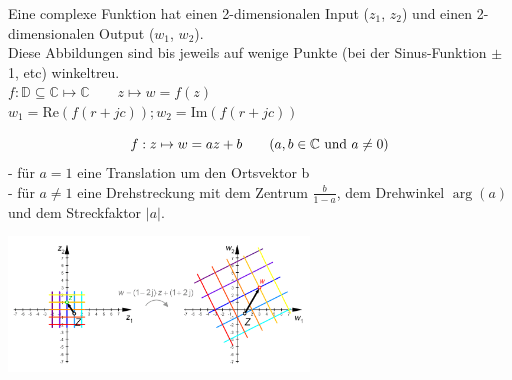 
\newpage
{}
Eine complexe Funktion hat einen 2-dimensionalen Input ($z_1$, $z_2$) und einen
2-dimensionalen Output ($w_1$, $w_2$). \\
Diese Abbildungen sind bis jeweils auf wenige Punkte (bei der Sinus-Funktion
$\pm$1, etc) winkeltreu.\\
$ f: \mathbb{D} \subseteq \mathbb{C} \mapsto \mathbb{C} \qquad z  \mapsto w = f(z)$\\
$w_1 = \text{Re}(f(r+jc)); w_2 = \text{Im}(f(r+jc))$ 
 

 	\begin{minipage}{9cm}
       $$ f : z \mapsto w = az + b \qquad (a, b \in \mathbb{C} \text{ und } a \neq0)\\$$
		- für $a = 1$ eine Translation um den Ortsvektor b \\
		- für $a \neq 1$ eine Drehstreckung mit dem Zentrum $\frac{b}{1-a}$, dem 
		Drehwinkel $\arg(a)$ und dem Streckfaktor $|a|$.  
    \end{minipage}
	\hspace{2cm}
	\begin{minipage}{8cm}
    	\includegraphics[width=8cm]{./bilder/LineareFunktion.png}
    \end{minipage}

